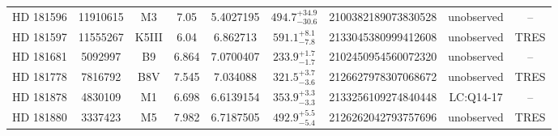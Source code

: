 \begin{table*}
\begin{tabular}{ccccccccc}
HD 181596 & 11910615 & M3 & 7.05 & 5.4027195 & $494.7^{+34.9}_{-30.6}$ & 2100382189073830528 & unobserved & -- \\
HD 181597 & 11555267 & K5III & 6.04 & 6.862713 & $591.1^{+8.1}_{-7.8}$ & 2133045380999412608 & unobserved & TRES \\
HD 181681 & 5092997 & B9 & 6.864 & 7.0700407 & $233.9^{+1.7}_{-1.7}$ & 2102450954560072320 & unobserved & -- \\
HD 181778 & 7816792 & B8V & 7.545 & 7.034088 & $321.5^{+3.7}_{-3.6}$ & 2126627978307068672 & unobserved & TRES \\
HD 181878 & 4830109 & M1 & 6.698 & 6.6139154 & $353.9^{+3.3}_{-3.3}$ & 2133256109274840448 & LC:Q14-17 & -- \\
HD 181880 & 3337423 & M5 & 7.982 & 6.7187505 & $492.9^{+5.5}_{-5.4}$ & 2126262042793757696 & unobserved & TRES \\
\hline
\end{tabular}
\end{table*}
